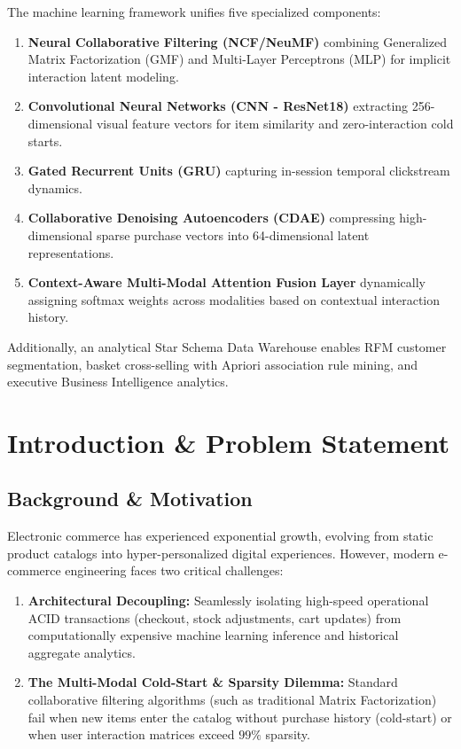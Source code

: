 \documentclass[12pt,a4paper,oneside]{report}
\begin{document}
The machine learning framework unifies five specialized components:
\begin{enumerate}
    \item \textbf{Neural Collaborative Filtering (NCF/NeuMF)} combining Generalized Matrix Factorization (GMF) and Multi-Layer Perceptrons (MLP) for implicit interaction latent modeling.
    \item \textbf{Convolutional Neural Networks (CNN - ResNet18)} extracting 256-dimensional visual feature vectors for item similarity and zero-interaction cold starts.
    \item \textbf{Gated Recurrent Units (GRU)} capturing in-session temporal clickstream dynamics.
    \item \textbf{Collaborative Denoising Autoencoders (CDAE)} compressing high-dimensional sparse purchase vectors into 64-dimensional latent representations.
    \item \textbf{Context-Aware Multi-Modal Attention Fusion Layer} dynamically assigning softmax weights across modalities based on contextual interaction history.
\end{enumerate}

Additionally, an analytical Star Schema Data Warehouse enables RFM customer segmentation, basket cross-selling with Apriori association rule mining, and executive Business Intelligence analytics.

\newpage

\tableofcontents
\listoffigures
\listoftables

\newpage

\chapter{Introduction \& Problem Statement}

\section{Background \& Motivation}
Electronic commerce has experienced exponential growth, evolving from static product catalogs into hyper-personalized digital experiences. However, modern e-commerce engineering faces two critical challenges:
\begin{enumerate}
    \item \textbf{Architectural Decoupling:} Seamlessly isolating high-speed operational ACID transactions (checkout, stock adjustments, cart updates) from computationally expensive machine learning inference and historical aggregate analytics.
    \item \textbf{The Multi-Modal Cold-Start \& Sparsity Dilemma:} Standard collaborative filtering algorithms (such as traditional Matrix Factorization) fail when new items enter the catalog without purchase history (cold-start) or when user interaction matrices exceed $99\%$ sparsity.
\end{enumerate}
\end{document}
